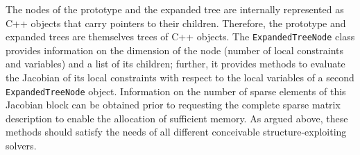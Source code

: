 \documentclass[10pt,a4paper]{report}
\begin{document}
The nodes of the prototype and the expanded tree are internally
represented as C++ objects that carry pointers to their children. 
Therefore, the prototype and expanded trees are themselves trees of C++ objects.
The {\tt ExpandedTreeNode} class provides information on the dimension
of the node (number of local constraints and variables) and a list of
its children; further, it provides methods to evaluate the Jacobian of
its local constraints with respect to the local variables of a second
{\tt ExpandedTreeNode} object. Information on the number of sparse
elements of this Jacobian block can be obtained prior to requesting
the complete sparse matrix description to enable the allocation of
sufficient memory. As argued above, these methods should satisfy
the needs of all different conceivable structure-exploiting solvers.




%
%
\end{document}
